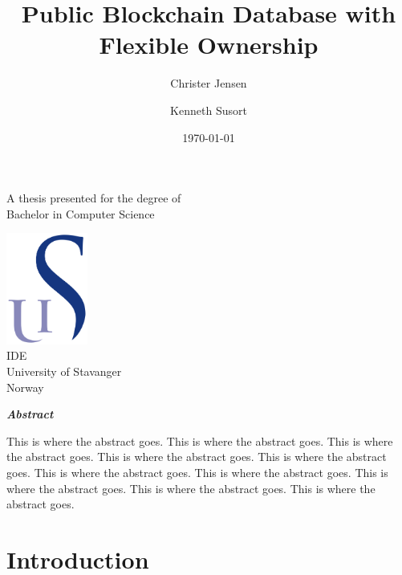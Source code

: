 \documentclass[12pt]{article}
\title{Public Blockchain Database with Flexible Ownership}
\author{Christer Jensen \and Kenneth Susort}
\date{\today}
\begin{document}

\begin{titlepage}
 \begin{center}
  
  \huge
  \textbf{\thetitle}
  
  \vspace{1.5cm}
  
  \textbf{\large\theauthor}
  
  \vfill
  
  {\Large A thesis presented for the degree of\\
  Bachelor in Computer Science}
  
  \vspace{0.8cm}
  
  \includegraphics[width=0.2\textwidth]{university_logo.png}\\
  \large
  IDE\\
  University of Stavanger\\
  Norway\\
  \thedate
  
 \end{center}
\end{titlepage}


\begin{center}
 \vspace*{4cm}
 \textbf{\textit{Abstract}}
\end{center}

This is where the abstract goes. This is where the abstract goes. This is where the abstract goes. This is where the abstract goes. This is where the abstract goes. This is where the abstract goes. This is where the abstract goes. This is where the abstract goes. This is where the abstract goes. This is where the abstract goes.
\newpage

\tableofcontents

\newpage
{}
\setcounter{page}{\theCurrentPage}

\section{Introduction}
\end{document}
